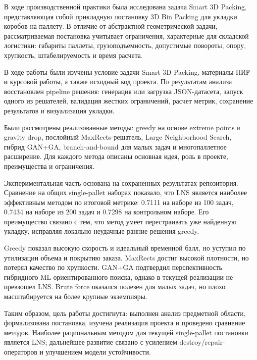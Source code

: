 
В ходе производственной практики была исследована задача Smart 3D Packing, представляющая собой прикладную постановку 3D Bin Packing для укладки коробов на паллету. В отличие от абстрактной геометрической задачи, рассматриваемая постановка учитывает ограничения, характерные для складской логистики: габариты паллеты, грузоподъемность, допустимые повороты, опору, хрупкость, штабелируемость и время расчета.

В ходе работы были изучены условие задачи Smart 3D Packing, материалы НИР и курсовой работы, а также исходный код проекта. По результатам анализа восстановлен pipeline решения: генерация или загрузка JSON-датасета, запуск одного из решателей, валидация жестких ограничений, расчет метрик, сохранение результатов и визуализация укладки.

Были рассмотрены реализованные методы: greedy на основе extreme points и gravity drop, послойный MaxRects-решатель, Large Neighborhood Search, гибрид GAN+GA, branch-and-bound для малых задач и многопаллетное расширение. Для каждого метода описаны основная идея, роль в проекте, преимущества и ограничения.

Экспериментальная часть основана на сохраненных результатах репозитория. Сравнение на общих single-pallet наборах показало, что LNS является наиболее эффективным методом по итоговой метрике: 0.7111 на наборе из 100 задач, 0.7434 на наборе из 200 задач и 0.7298 на контрольном наборе. Его преимущество связано с тем, что метод умеет перестраивать уже найденную укладку, исправляя локально неудачные ранние решения greedy.

Greedy показал высокую скорость и идеальный временной балл, но уступил по утилизации объема и покрытию заказа. MaxRects достиг высокой плотности, но потерял качество по хрупкости. GAN+GA подтвердил перспективность гибридного ML-ориентированного поиска, однако в текущей реализации не превзошел LNS. Brute force оказался полезен для малых задач, но плохо масштабируется на более крупные экземпляры.

Таким образом, цель работы достигнута: выполнен анализ предметной области, формализована постановка, изучена реализация проекта и проведено сравнение методов. Наиболее рациональным методом для текущей single-pallet постановки является LNS; дальнейшее развитие связано с усилением destroy/repair-операторов и улучшением модели устойчивости.
